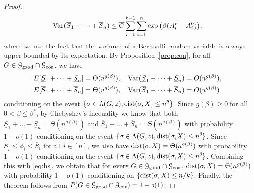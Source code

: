 \documentclass{article}
\begin{document}
\begin{proof}
\begin{align*}
	\operatorname{Var}(\overline{S}_1 + \dots + \overline{S}_n) \le \overline{C}
	\sum_{r=1}^{k-1}\sum_{i=1}^n \exp\big(\beta (A^r_i-A^0_i) \big) ,
	\end{align*}
	where we use the fact that the variance of a Bernoulli random variable is always upper bounded by its expectation.
	By Proposition~\ref{prop:con}, for all $G\in\mathcal{G}_{\operatorname{good}}\cap\mathcal{G}_{\operatorname{con}}$, we have 
	\begin{align*}
	& E[\underline{S}_1 + \dots + \underline{S}_n] = \Theta(n^{g(\beta)}) , \quad
	\operatorname{Var}(\underline{S}_1 + \dots + \underline{S}_n) = O(n^{g(\beta)}) , \\
	& E[\overline{S}_1 + \dots + \overline{S}_n] = \Theta(n^{g(\beta)}) , \quad
	\operatorname{Var}(\overline{S}_1 + \dots + \overline{S}_n) = O(n^{g(\beta)}) 
	\end{align*}
	conditioning on the event $\{\sigma\in \Lambda(G,z) ,\operatorname{dist}(\sigma, X) \le n^{\theta}\}$. Since $g(\beta)\ge 0$ for all $0<\beta\le \beta^\ast$, by Chebyshev's inequality we know that both $\underline{S}_1 + \dots + \underline{S}_n=\Theta(n^{g(\beta)})$ and $\overline{S}_1 + \dots + \overline{S}_n=\Theta(n^{g(\beta)})$ with probability $1-o(1)$ conditioning on the event $\{\sigma\in \Lambda(G,z) ,\operatorname{dist}(\sigma, X) \le n^{\theta}\}$.
	Since $\underline{S}_i\le \phi_i\le \overline{S}_i$ for all $i\in[n]$, we also have $\operatorname{dist}(\sigma,X)=\Theta(n^{g(\beta)})$ with probability $1-o(1)$ conditioning on the event $\{\sigma\in \Lambda(G,z) ,\operatorname{dist}(\sigma, X) \le n^{\theta}\}$. Combining this with \eqref{eq:hs}, we obtain that for every $G\in\mathcal{G}_{\operatorname{good}}\cap\mathcal{G}_{\operatorname{con}}$, $\operatorname{dist}(\sigma,X)=\Theta(n^{g(\beta)})$ with probability $1-o(1)$ conditioning on $\{\operatorname{dist}(\sigma, X) \le n/k\}$. Finally, the theorem follows from $P(G\in\mathcal{G}_{\operatorname{good}}\cap\mathcal{G}_{\operatorname{con}})=1-o(1)$.
	

\end{proof}
\end{document}
